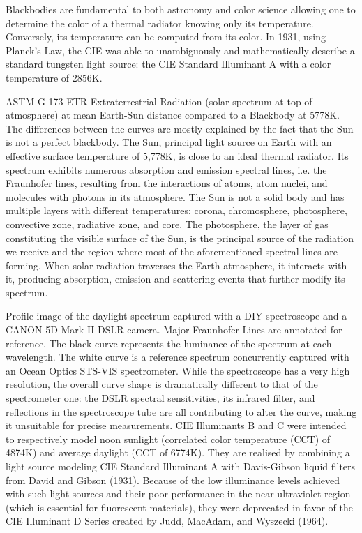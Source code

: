 Blackbodies are fundamental to both astronomy and color science allowing one to determine the color of a thermal radiator knowing only its temperature. Conversely, its temperature can be computed from its color.
In 1931, using Planck's Law, the CIE was able to unambiguously and mathematically describe a standard tungsten light source: the CIE Standard Illuminant A with a color temperature of 2856K.


ASTM G-173 ETR Extraterrestrial Radiation (solar spectrum at top of atmosphere) at mean Earth-Sun distance compared to a Blackbody at 5778K. The differences between the curves are mostly explained by the fact that the Sun is not a perfect blackbody.
The Sun, principal light source on Earth with an effective surface temperature of 5,778K, is close to an ideal thermal radiator. Its spectrum exhibits numerous absorption and emission spectral lines, i.e. the Fraunhofer lines, resulting from the interactions of atoms, atom nuclei, and molecules with photons in its atmosphere. The Sun is not a solid body and has multiple layers with different temperatures: corona, chromosphere, photosphere, convective zone, radiative zone, and core. The photosphere, the layer of gas constituting the visible surface of the Sun, is the principal source of the radiation we receive and the region where most of the aforementioned spectral lines are forming. When solar radiation traverses the Earth atmosphere, it interacts with it, producing absorption, emission and scattering events that further modify its spectrum.

Profile image of the daylight spectrum captured with a DIY spectroscope and a CANON 5D Mark II DSLR camera. Major Fraunhofer Lines are annotated for reference. The black curve represents the luminance of the spectrum at each wavelength. The white curve is a reference spectrum concurrently captured with an Ocean Optics STS-VIS spectrometer. While the spectroscope has a very high resolution, the overall curve shape is dramatically different to that of the spectrometer one: the DSLR spectral sensitivities, its infrared filter, and reflections in the spectroscope tube are all contributing to alter the curve, making it unsuitable for precise measurements.
CIE Illuminants B and C were intended to respectively model noon sunlight (correlated color temperature (CCT) of 4874K) and average daylight (CCT of 6774K). They are realised by combining a light source modeling CIE Standard Illuminant A with Davis-Gibson liquid filters from David and Gibson (1931). Because of the low illuminance levels achieved with such light sources and their poor performance in the near-ultraviolet region (which is essential for fluorescent materials), they were deprecated in favor of the CIE Illuminant D Series created by Judd, MacAdam, and Wyszecki (1964).

